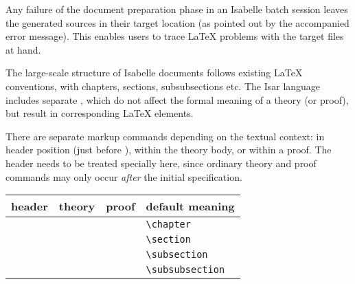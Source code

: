 \begin{isabellebody}
\begin{isamarkuptext}
  \medskip Any failure of the document preparation phase in an
  Isabelle batch session leaves the generated sources in their target
  location (as pointed out by the accompanied error message).  This
  enables users to trace {\LaTeX} problems with the target files at
  hand.%
\end{isamarkuptext}%
\isamarkuptrue%
%
\isamarkuptrue%
%
\begin{isamarkuptext}%
The large-scale structure of Isabelle documents follows existing
  {\LaTeX} conventions, with chapters, sections, subsubsections etc.
  The Isar language includes separate , which
  do not affect the formal meaning of a theory (or proof), but result
  in corresponding {\LaTeX} elements.

  There are separate markup commands depending on the textual context:
  in header position (just before ), within the
  theory body, or within a proof.  The header needs to be treated
  specially here, since ordinary theory and proof commands may only
  occur \emph{after} the initial  specification.

  \medskip

  \begin{tabular}{llll}
  header & theory & proof & default meaning \\\hline
    & \commdx{chapter} & & \verb,\chapter, \\
  \commdx{header} & \commdx{section} & \commdx{sect} & \verb,\section, \\
    & \commdx{subsection} & \commdx{subsect} & \verb,\subsection, \\
    & \commdx{subsubsection} & \commdx{subsubsect} & \verb,\subsubsection, \\
  \end{tabular}

  \medskip


\end{isamarkuptext}
\end{isabellebody}

